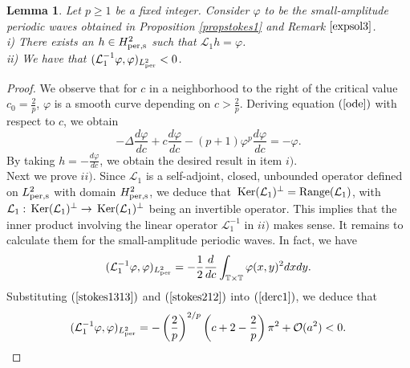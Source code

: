 \documentclass[12pt,reqno,a4paper]{amsart} %
\newcommand{\Ker}{{\rm \,Ker}}
\numberwithin{equation}{section}
\numberwithin{figure}{section}
\newtheorem{lemma}[theorem]{Lemma}
\begin{document}
\begin{lemma}\label{bouL3}
Let $p\geq1$ be a fixed integer. Consider $\varphi$ to be the small-amplitude periodic waves obtained in Proposition \ref{propstokes1} and Remark $\ref{expsol3}$.\\
i) There exists an $h \in H_{\rm per,s}^2$ such that $\mathcal{L}_1 h = \varphi$.\\
ii) We have that $(\mathcal{L}_1^{-1}\varphi,\varphi)_{L_{\rm per}^2}<0$.
\end{lemma}
\begin{proof}
We observe that for $c$ in a neighborhood to the right of the critical value $c_0 = \frac{2}{p}$, $\varphi$ is a smooth curve depending on  $c>\frac{2}{p}$. Deriving equation $(\ref{ode})$ with respect to $c$, we obtain
\begin{equation}\label{dervarphi}
	-\Delta \frac{d\varphi}{dc}+c\frac{d\varphi}{dc}-(p+1)\varphi^{p}\frac{d\varphi}{dc}=-\varphi.
	\end{equation}
	By taking $h=-\frac{d\varphi}{dc}$, we obtain the desired result in item $i)$.\\
	\indent Next we prove $ii)$. Since $\mathcal{L}_1$ is a self-adjoint, closed, unbounded operator defined on $L_{\rm per,s}^2$ with domain $H_{\rm per,s}^2$, we deduce that $\Ker(\mathcal{L}_1)^{\bot} = {\rm Range}(\mathcal{L}_1)$, with $\mathcal{L}_1: \Ker(\mathcal{L}_1)^{\bot} \rightarrow \Ker(\mathcal{L}_1)^{\bot}$ being an invertible operator. This implies that the inner product involving the linear operator $\mathcal{L}_1^{-1}$ in $ii)$ makes sense. It remains to calculate them for the small-amplitude periodic waves. In fact, we have 
	\begin{equation}\label{derc1}(\mathcal{L}_1^{-1}\varphi,\varphi)_{L_{\rm per}^2}=-\frac{1}{2}\frac{d}{dc}\int_{\mathbb{T}\times\mathbb{T}}\varphi(x,y)^2dxdy.
	\end{equation}
 Substituting $(\ref{stokes1313})$ and $(\ref{stokes212})$ into $(\ref{derc1})$, we deduce that 
	$$(\mathcal{L}_1^{-1}\varphi,\varphi)_{L_{\rm per}^2}=-\left(\frac{2}{p}\right)^{2/p}\left(c+2-\frac{2}{p}\right)\pi^2+\mathcal{O}(a^2)<0.$$
\end{proof}
\end{document}
